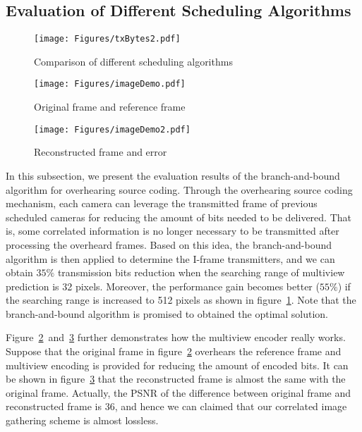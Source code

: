 \subsection{Evaluation of Different Scheduling Algorithms}
\begin{figure}
\begin{center}
\texttt{[image: Figures/txBytes2.pdf]}
\caption{\label{fig::evaSearchRng}Comparison of different scheduling algorithms}
\end{center}
\end{figure}
%
\begin{figure}
\begin{center}
\texttt{[image: Figures/imageDemo.pdf]}
\caption{\label{fig::imageDemo}Original frame and reference frame}
\end{center}
\end{figure}
%
\begin{figure}
\begin{center}
\texttt{[image: Figures/imageDemo2.pdf]}
\caption{\label{fig::imageDemo2}Reconstructed frame and error}
\end{center}
\end{figure}
%
In this subsection, we present the evaluation results of the branch-and-bound algorithm for overhearing source coding.
Through the overhearing source coding mechanism, each camera can leverage the transmitted frame of previous scheduled cameras for reducing the amount of bits needed to be delivered.
That is, some correlated information is no longer necessary to be transmitted after processing the overheard frames.
Based on this idea, the branch-and-bound algorithm is then applied to determine the I-frame transmitters, and we can obtain $35\%$ transmission bits reduction when the searching range of multiview prediction is 32 pixels.
Moreover, the performance gain becomes better ($55\%$) if the searching range is increased to 512 pixels as shown in figure~\ref{fig::evaSearchRng}.
Note that the branch-and-bound algorithm is promised to obtained the optimal solution.

Figure~\ref{fig::imageDemo}~and~\ref{fig::imageDemo2} further demonstrates how the multiview encoder really works.
Suppose that the original frame in figure~\ref{fig::imageDemo} overhears the reference frame and multiview encoding is provided for reducing the amount of encoded bits.
It can be shown in figure~\ref{fig::imageDemo2} that the reconstructed frame is almost the same with the original frame.
Actually, the PSNR of the difference between original frame and reconstructed frame is 36, and hence we can claimed that our correlated image gathering scheme is almost lossless.
%
